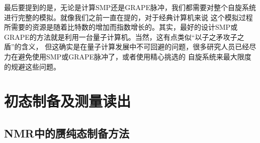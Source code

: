 最后要提到的是，无论是计算SMP还是GRAPE脉冲，我们都需要对整个自旋系统进行完整的模拟。就像我们之前一直在提的，对于经典计算机来说
这个模拟过程所需要的资源是随着比特数的增加而指数增长的。其实，最好的设计SMP或GRAPE的方法就是利用一台量子计算机。当然，这有点类似“以子之矛攻子之盾”的含义，
但这确实是在量子计算发展中不可回避的问题，很多研究人员已经尽力在避免使用SMP或GRAPE脉冲了，或者使用精心挑选的
自旋系统来最大限度的规避这些问题。

\section{初态制备及测量读出}

\subsection{NMR中的赝纯态制备方法}

